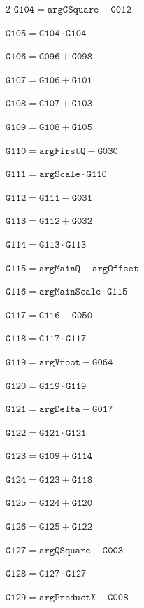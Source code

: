 \documentclass[10pt]{article}
\begin{document}
\begin{multicols}{2}
\noindent $\mathtt{G104}=\mathtt{argCSquare}-\mathtt{G012}$\par
\noindent $\mathtt{G105}=\mathtt{G104}\cdot \mathtt{G104}$\par
\noindent $\mathtt{G106}=\mathtt{G096}+\mathtt{G098}$\par
\noindent $\mathtt{G107}=\mathtt{G106}+\mathtt{G101}$\par
\noindent $\mathtt{G108}=\mathtt{G107}+\mathtt{G103}$\par
\noindent $\mathtt{G109}=\mathtt{G108}+\mathtt{G105}$\par
\noindent $\mathtt{G110}=\mathtt{argFirstQ}-\mathtt{G030}$\par
\noindent $\mathtt{G111}=\mathtt{argScale}\cdot \mathtt{G110}$\par
\noindent $\mathtt{G112}=\mathtt{G111}-\mathtt{G031}$\par
\noindent $\mathtt{G113}=\mathtt{G112}+\mathtt{G032}$\par
\noindent $\mathtt{G114}=\mathtt{G113}\cdot \mathtt{G113}$\par
\noindent $\mathtt{G115}=\mathtt{argMainQ}-\mathtt{argOffset}$\par
\noindent $\mathtt{G116}=\mathtt{argMainScale}\cdot \mathtt{G115}$\par
\noindent $\mathtt{G117}=\mathtt{G116}-\mathtt{G050}$\par
\noindent $\mathtt{G118}=\mathtt{G117}\cdot \mathtt{G117}$\par
\noindent $\mathtt{G119}=\mathtt{argVroot}-\mathtt{G064}$\par
\noindent $\mathtt{G120}=\mathtt{G119}\cdot \mathtt{G119}$\par
\noindent $\mathtt{G121}=\mathtt{argDelta}-\mathtt{G017}$\par
\noindent $\mathtt{G122}=\mathtt{G121}\cdot \mathtt{G121}$\par
\noindent $\mathtt{G123}=\mathtt{G109}+\mathtt{G114}$\par
\noindent $\mathtt{G124}=\mathtt{G123}+\mathtt{G118}$\par
\noindent $\mathtt{G125}=\mathtt{G124}+\mathtt{G120}$\par
\noindent $\mathtt{G126}=\mathtt{G125}+\mathtt{G122}$\par
\noindent $\mathtt{G127}=\mathtt{argQSquare}-\mathtt{G003}$\par
\noindent $\mathtt{G128}=\mathtt{G127}\cdot \mathtt{G127}$\par
\noindent $\mathtt{G129}=\mathtt{argProductX}-\mathtt{G008}$\par

\end{multicols}
\end{document}

